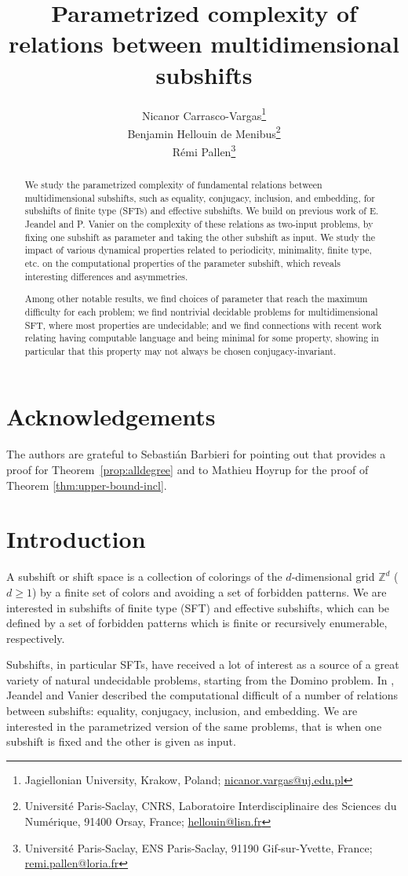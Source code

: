 \documentclass[a4paper]{article}
\title{Parametrized complexity of relations between multidimensional subshifts}
\author{Nicanor Carrasco-Vargas\thanks{Jagiellonian University, Krakow, Poland; \url{nicanor.vargas@uj.edu.pl}}\\ Benjamin Hellouin de Menibus\thanks{Université Paris-Saclay, CNRS, Laboratoire Interdisciplinaire des Sciences du Numérique, 91400 Orsay, France;  \url{hellouin@lisn.fr}}\\Rémi Pallen\thanks{Université Paris-Saclay, ENS Paris-Saclay, 91190 Gif-sur-Yvette, France; \url{remi.pallen@loria.fr}}}
\date{}
\theoremstyle{definition}
\begin{document}
\maketitle
\begin{abstract}
We study the parametrized complexity of fundamental relations between multidimensional subshifts, such as equality, conjugacy, inclusion, and embedding, for subshifts of finite type (SFTs) and effective subshifts. We build on previous work of E. Jeandel and P. Vanier on the complexity of these relations as two-input problems, by fixing one subshift as parameter and taking the other subshift as input. We study the impact of various dynamical properties related to periodicity, minimality, finite type, etc. on the computational properties of the parameter subshift, which reveals interesting differences and asymmetries.

Among other notable results, we find choices of parameter that reach the maximum difficulty for each problem; we find nontrivial decidable problems for multidimensional SFT, where most properties are undecidable; and we find connections with recent work relating having computable language and being minimal for some property, showing in particular that this property may not always be chosen conjugacy-invariant.
 \end{abstract}
\thispagestyle{empty}
\clearpage
\setcounter{page}{1}

\section*{Acknowledgements}
The authors are grateful to Sebasti\'an Barbieri for pointing out that \cite{barbieri2024zero} provides a proof for Theorem~\ref{prop:alldegree} and to Mathieu Hoyrup for the proof of Theorem \ref{thm:upper-bound-incl}.

\section{Introduction}
A subshift or shift space is a collection of colorings of the $d$-dimensional grid $\mathbb{Z}^d$ ($d\geq 1$) by a finite set of colors and avoiding a set of forbidden patterns. We are interested in subshifts of finite type (SFT) and effective subshifts, which can be defined by a set of forbidden patterns which is finite or recursively enumerable, respectively. 

Subshifts, in particular SFTs, have received a lot of interest as a source of a great variety of natural undecidable problems, starting from the Domino problem. In \cite{jeandel_hardness_2015}, Jeandel and Vanier described the computational difficult of a number of relations between subshifts: equality, conjugacy, inclusion, and embedding. We are interested in the parametrized version of the same problems, that is when one subshift is fixed and the other is given as input.
\end{document}
